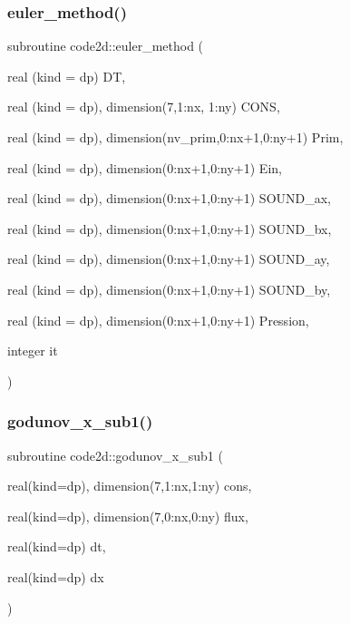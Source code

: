 \mbox{\label{main2Dv1_8f90_ae744869b9c4a59dc194f1d9d7dfcb3f1}} 
\subsubsection{\texorpdfstring{euler\+\_\+method()}{euler\_method()}}
{\footnotesize\ttfamily subroutine code2d\+::euler\+\_\+method (\begin{DoxyParamCaption}\item[{real (kind = dp)}]{DT,  }\item[{real (kind = dp), dimension(7,1\+:nx, 1\+:ny)}]{C\+O\+NS,  }\item[{real (kind = dp), dimension(nv\+\_\+prim,0\+:nx+1,0\+:ny+1)}]{Prim,  }\item[{real (kind = dp), dimension(0\+:nx+1,0\+:ny+1)}]{Ein,  }\item[{real (kind = dp), dimension(0\+:nx+1,0\+:ny+1)}]{S\+O\+U\+N\+D\+\_\+ax,  }\item[{real (kind = dp), dimension(0\+:nx+1,0\+:ny+1)}]{S\+O\+U\+N\+D\+\_\+bx,  }\item[{real (kind = dp), dimension(0\+:nx+1,0\+:ny+1)}]{S\+O\+U\+N\+D\+\_\+ay,  }\item[{real (kind = dp), dimension(0\+:nx+1,0\+:ny+1)}]{S\+O\+U\+N\+D\+\_\+by,  }\item[{real (kind = dp), dimension(0\+:nx+1,0\+:ny+1)}]{Pression,  }\item[{integer}]{it }\end{DoxyParamCaption})}

\mbox{\label{main2Dv1_8f90_aec66a1d113ade1d60ad864482ea8e4cf}} 
\subsubsection{\texorpdfstring{godunov\+\_\+x\+\_\+sub1()}{godunov\_x\_sub1()}}
{\footnotesize\ttfamily subroutine code2d\+::godunov\+\_\+x\+\_\+sub1 (\begin{DoxyParamCaption}\item[{real(kind=dp), dimension(7,1\+:nx,1\+:ny)}]{cons,  }\item[{real(kind=dp), dimension(7,0\+:nx,0\+:ny)}]{flux,  }\item[{real(kind=dp)}]{dt,  }\item[{real(kind=dp)}]{dx }\end{DoxyParamCaption})}

